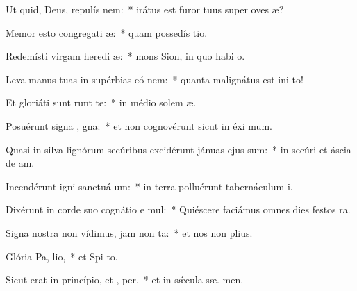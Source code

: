 \item Ut quid, Deus, repulís  nem:~* irátus est furor tuus super oves  æ?
\item Memor esto congregati æ:~* quam possedís  tio.
\item Redemísti virgam heredi æ:~* mons Sion, in quo habi  o.
\item Leva manus tuas in supérbias eó  nem:~* quanta malignátus est ini  to!
\item Et gloriáti sunt  runt te:~* in médio solem æ.
\item Posuérunt signa , gna:~* et non cognovérunt sicut in éxi  mum.
\item Quasi in silva lignórum secúribus excidérunt jánuas ejus  sum:~* in secúri et áscia de am.
\item Incendérunt igni sanctuá um:~* in terra polluérunt tabernáculum  i.
\item Dixérunt in corde suo cognátio e mul:~* Quiéscere faciámus omnes dies festos   ra.
\item Signa nostra non vídimus, jam non  ta:~* et nos non  plius.
\item Glória Pa,  lio,~* et Spi to.
\item Sicut erat in princípio, et ,  per,~* et in sǽcula sæ. men.
